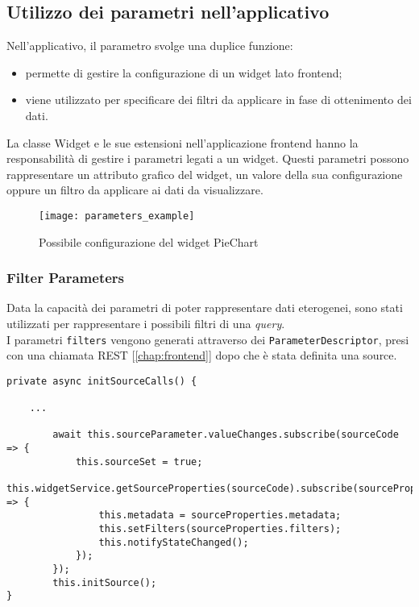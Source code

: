 \subsection{Utilizzo dei parametri nell'applicativo}
Nell'applicativo, il parametro svolge una duplice funzione:
\begin{itemize}
\item permette di gestire la configurazione di un widget lato frontend;
\item viene utilizzato per specificare dei filtri da applicare in fase di ottenimento dei dati.
\end{itemize}
La classe Widget e le sue estensioni nell'applicazione frontend hanno la responsabilità di gestire i parametri legati a un widget. Questi parametri possono rappresentare un attributo grafico del widget, un valore della sua configurazione oppure un filtro da applicare ai dati da visualizzare.
\begin{figure}[h!]
\begin{center}
\texttt{[image: parameters\_example]}\\
\caption{Possibile configurazione del widget PieChart}
\end{center}
\end{figure}
\subsubsection{Filter Parameters}
Data la capacità dei parametri di poter rappresentare dati eterogenei, sono stati utilizzati per rappresentare i possibili filtri di una \textit{query}.\\
I parametri \verb|filters| vengono generati attraverso dei \verb|ParameterDescriptor|, presi con una chiamata REST [\ref{chap:frontend}] dopo che è stata definita una source.
\begin{lstlisting}[caption={initSourceCalls, base-widget.ts},style=javascriptCode]
private async initSourceCalls() {

	...
	
        await this.sourceParameter.valueChanges.subscribe(sourceCode => {
            this.sourceSet = true;
            this.widgetService.getSourceProperties(sourceCode).subscribe(sourceProperties => {
                this.metadata = sourceProperties.metadata;
                this.setFilters(sourceProperties.filters);
                this.notifyStateChanged();
            });
        });
        this.initSource();
}
\end{lstlisting}